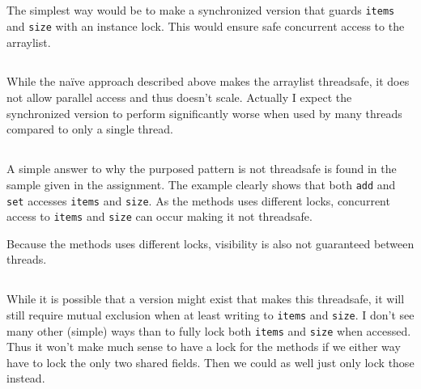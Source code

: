 \documentclass{ituhandin}
\begin{document}
\chapter{} %
\section{}
The simplest way would be to make a synchronized version that guards \texttt{items} and \texttt{size} with an instance lock. This would ensure safe concurrent access to the arraylist.
\section{}\label{sec:lock}
While the naïve approach described above makes the arraylist threadsafe, it does not allow parallel access and thus doesn't scale. Actually I expect the synchronized version to perform significantly worse when used by many threads compared to only a single thread.
\section{}
A simple answer to why the purposed pattern is not threadsafe is found in the sample given in the assignment. The example clearly shows that both \texttt{add} and \texttt{set} accesses \texttt{items} and \texttt{size}. As the methods uses different locks, concurrent access to \texttt{items} and \texttt{size} can occur making it not threadsafe.

Because the methods uses different locks, visibility is also not guaranteed between threads.

\section{}
While it is possible that a version might exist that makes this threadsafe, it will still require mutual exclusion when at least writing to \texttt{items} and \texttt{size}. I don't see many other (simple) ways than to fully lock both \texttt{items} and \texttt{size} when accessed. Thus it won't make much sense to have a lock for the methods if we either way have to lock the only two shared fields. Then we could as well just only lock those instead.
\end{document}
